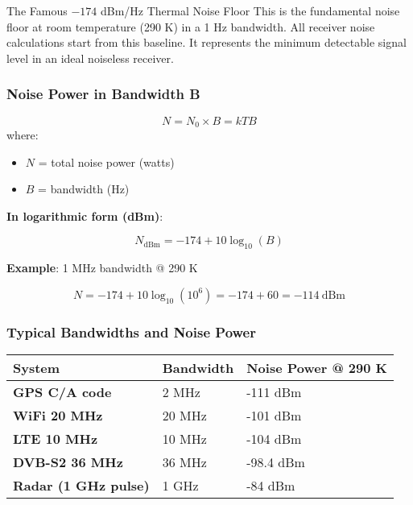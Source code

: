 \begin{calloutbox}{The Famous $-174$ dBm/Hz Thermal Noise Floor}
This is the fundamental noise floor at room temperature (290 K) in a 1 Hz bandwidth. All receiver noise calculations start from this baseline. It represents the minimum detectable signal level in an ideal noiseless receiver.
\end{calloutbox}

\subsubsection{Noise Power in Bandwidth B}

\begin{equation}
N = N_0 \times B = kTB
\end{equation}
where:
\begin{itemize}
\item $N$ = total noise power (watts)
\item $B$ = bandwidth (Hz)
\end{itemize}

\textbf{In logarithmic form (dBm)}:

\begin{equation}
N_{\text{dBm}} = -174 + 10\log_{10}(B)
\end{equation}

\textbf{Example}: 1 MHz bandwidth @ 290 K

\begin{equation}
N = -174 + 10\log_{10}(10^6) = -174 + 60 = -114~\text{dBm}
\end{equation}

\subsubsection{Typical Bandwidths and Noise
Power}\label{typical-bandwidths-and-noise-power}

{\def\LTcaptype{} %
\begin{longtable}[]{@{}lll@{}}
\toprule\noalign{}
System & Bandwidth & Noise Power @ 290 K \\
\midrule\noalign{}
\endhead
\bottomrule\noalign{}
\endlastfoot
\textbf{GPS C/A code} & 2 MHz & -111 dBm \\
\textbf{WiFi 20 MHz} & 20 MHz & -101 dBm \\
\textbf{LTE 10 MHz} & 10 MHz & -104 dBm \\
\textbf{DVB-S2 36 MHz} & 36 MHz & -98.4 dBm \\
\textbf{Radar (1 GHz pulse)} & 1 GHz & -84 dBm \\
\end{longtable}
}

